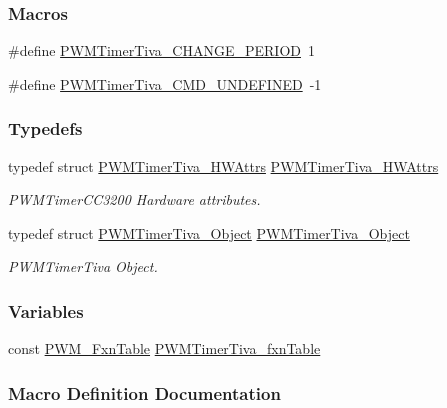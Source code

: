 \subsubsection*{Macros}
\begin{DoxyCompactItemize}
\item 
\#define \hyperlink{_p_w_m_timer_tiva_8h_ad16a2de6625d6aabef487d2ec63e447c}{P\-W\-M\-Timer\-Tiva\-\_\-\-C\-H\-A\-N\-G\-E\-\_\-\-P\-E\-R\-I\-O\-D}~1
\item 
\#define \hyperlink{_p_w_m_timer_tiva_8h_a609b29cb0990238f0610fec043802558}{P\-W\-M\-Timer\-Tiva\-\_\-\-C\-M\-D\-\_\-\-U\-N\-D\-E\-F\-I\-N\-E\-D}~-\/1
\end{DoxyCompactItemize}
\subsubsection*{Typedefs}
\begin{DoxyCompactItemize}
\item 
typedef struct \hyperlink{struct_p_w_m_timer_tiva___h_w_attrs}{P\-W\-M\-Timer\-Tiva\-\_\-\-H\-W\-Attrs} \hyperlink{_p_w_m_timer_tiva_8h_adfca3d3443cb74ff428f0e95e5cceefb}{P\-W\-M\-Timer\-Tiva\-\_\-\-H\-W\-Attrs}
\begin{DoxyCompactList}\small\item\em P\-W\-M\-Timer\-C\-C3200 Hardware attributes. \end{DoxyCompactList}\item 
typedef struct \hyperlink{struct_p_w_m_timer_tiva___object}{P\-W\-M\-Timer\-Tiva\-\_\-\-Object} \hyperlink{_p_w_m_timer_tiva_8h_aa113ed38a67720c1fbd892428c1a9952}{P\-W\-M\-Timer\-Tiva\-\_\-\-Object}
\begin{DoxyCompactList}\small\item\em P\-W\-M\-Timer\-Tiva Object. \end{DoxyCompactList}\end{DoxyCompactItemize}
\subsubsection*{Variables}
\begin{DoxyCompactItemize}
\item 
const \hyperlink{struct_p_w_m___fxn_table}{P\-W\-M\-\_\-\-Fxn\-Table} \hyperlink{_p_w_m_timer_tiva_8h_a9635643df3533a0642e7caa819c01a40}{P\-W\-M\-Timer\-Tiva\-\_\-fxn\-Table}
\end{DoxyCompactItemize}


\subsubsection{Macro Definition Documentation}
